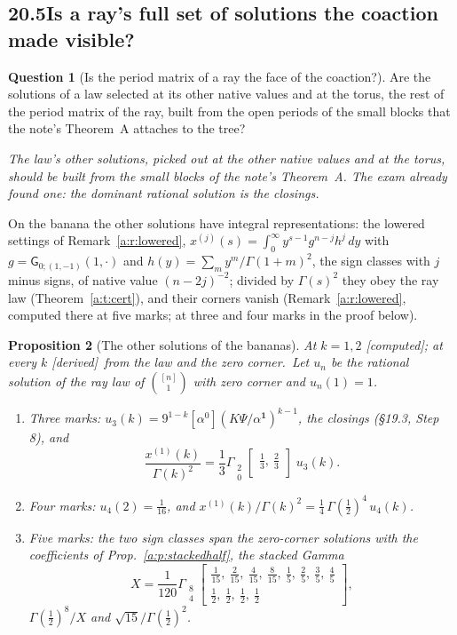 \documentclass[11pt]{article}
\newcommand{\one}{\mathbf 1}
\newcommand{\sG}{\mathsf G}
\newcommand{\Gst}[4]{\Gamma_{\substack{#1\\#2}}\!\begin{bmatrix}#3\\#4\end{bmatrix}}
\theoremstyle{plain}
\newtheorem{proposition}{Proposition}[section]
\theoremstyle{definition}
\newtheorem{question}[proposition]{Question}
\theoremstyle{remark}
\newcommand{\derived}{\textup{[derived]}}
\newcommand{\computed}{\textup{[computed]}}
\begin{document}
\subsection*{20.5\quad Is a ray's full set of solutions the coaction made visible?}

\begin{question}[Is the period matrix of a ray the face of the coaction?]\label{a:q:matrix}
Are the solutions of a law selected at its other native values and at the torus, the rest of the period matrix of the ray, built from the open periods of the small blocks that the note's Theorem~A attaches to the tree?
\end{question}

\emph{The law's other solutions, picked out at the other native values and at the torus, should be built from the small blocks of the note's Theorem~A. The exam already found one: the dominant rational solution is the closings.}

On the banana the other solutions have integral representations: the lowered settings of Remark~\ref{a:r:lowered}, $x^{(j)}(s)=\int_0^\infty y^{s-1}g^{n-j}h^j\,dy$ with $g=\sG_{0;(1,-1)}(1,\cdot)$ and $h(y)=\sum_my^m/\Gamma(1+m)^2$, the sign classes with $j$ minus signs, of native value $(n-2j)^{-2}$; divided by $\Gamma(s)^2$ they obey the ray law (Theorem~\ref{a:t:cert}), and their corners vanish (Remark~\ref{a:r:lowered}, computed there at five marks; at three and four marks in the proof below).

\begin{proposition}[The other solutions of the bananas]\label{b:p:otherbanana}At $k=1,2$ \computed; at every $k$ \derived\ from the law and the zero corner.\
Let $u_n$ be the rational solution of the ray law of $\binom{[n]}1$ with zero corner and $u_n(1)=1$.
\begin{enumerate}[label=(\roman*)]
\item Three marks: $u_3(k)=9^{1-k}[\alpha^0](K\Psi/\alpha^{\one})^{k-1}$, the closings (\S19.3, Step 8), and
\[
\frac{x^{(1)}(k)}{\Gamma(k)^2}=\frac13\Gst20{\frac13,\ \frac23}{}\;u_3(k).
\]
\item Four marks: $u_4(2)=\frac1{16}$, and $x^{(1)}(k)/\Gamma(k)^2=\frac14\,\Gamma(\frac12)^4\,u_4(k)$.
\item Five marks: the two sign classes span the zero-corner solutions with the coefficients of Prop.~\ref{a:p:stackedhalf}, the stacked Gamma
\[
X=\frac1{120}\Gst84{\frac1{15},\ \frac2{15},\ \frac4{15},\ \frac8{15},\ \frac15,\ \frac25,\ \frac35,\ \frac45}{\frac12,\ \frac12,\ \frac12,\ \frac12},
\]
$\Gamma(\frac12)^8/X$ and $\sqrt{15}/\Gamma(\frac12)^2$.
\end{enumerate}
\end{proposition}
\end{document}
